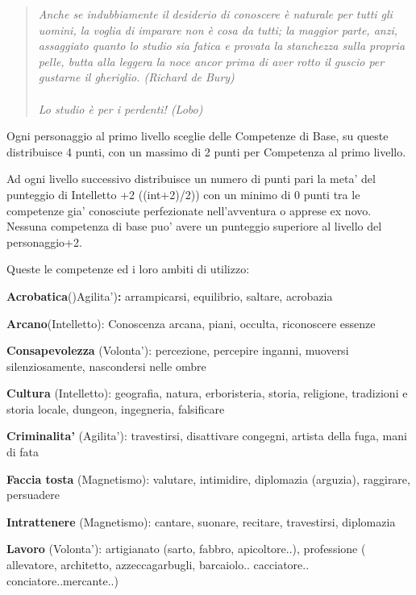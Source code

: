 \documentclass[a4paper,11pt,twoside,openany]{book}
\begin{document}
\label{competenze-di-base}

\begin{quote}\textit{
Anche se indubbiamente il desiderio di conoscere è naturale per tutti gli uomini, la voglia di imparare non è cosa da tutti; la maggior parte, anzi, assaggiato quanto lo studio sia fatica e provata la stanchezza sulla propria pelle, butta alla leggera la noce ancor prima di aver rotto il guscio per gustarne il gheriglio. (Richard de Bury)\\\\
Lo studio è per i perdenti! (Lobo)
}\end{quote}

Ogni personaggio al primo livello sceglie delle Competenze di Base, su queste distribuisce 4 punti, con un massimo di 2 punti per Competenza al primo livello.

Ad ogni livello successivo distribuisce un numero di punti pari la meta' del punteggio di Intelletto +2 ((int+2)/2)) con un minimo di 0 punti tra le competenze gia' conosciute perfezionate nell'avventura o apprese ex novo. Nessuna competenza di base puo' avere un  punteggio superiore al livello del personaggio+2.

\bigskip

Queste le competenze ed i loro ambiti di utilizzo:

\textbf{Acrobatica}()Agilita')\textbf{:} arrampicarsi, equilibrio, saltare, acrobazia

\textbf{Arcano}(Intelletto): Conoscenza arcana, piani, occulta, riconoscere essenze

\textbf{Consapevolezza} (Volonta'): percezione, percepire inganni, muoversi silenziosamente, nascondersi nelle ombre

\textbf{Cultura} (Intelletto): geografia, natura, erboristeria, storia, religione, tradizioni e storia locale, dungeon, ingegneria, falsificare

\textbf{Criminalita'} (Agilita'): travestirsi, disattivare congegni, artista della fuga, mani di fata

\textbf{Faccia tosta} (Magnetismo): valutare, intimidire, diplomazia (arguzia), raggirare, persuadere

\textbf{Intrattenere} (Magnetismo): cantare, suonare, recitare, travestirsi, diplomazia

\textbf{Lavoro} (Volonta'): artigianato (sarto, fabbro, apicoltore..), professione ( allevatore, architetto, azzeccagarbugli, barcaiolo.. cacciatore.. conciatore..mercante..)
\end{document}
